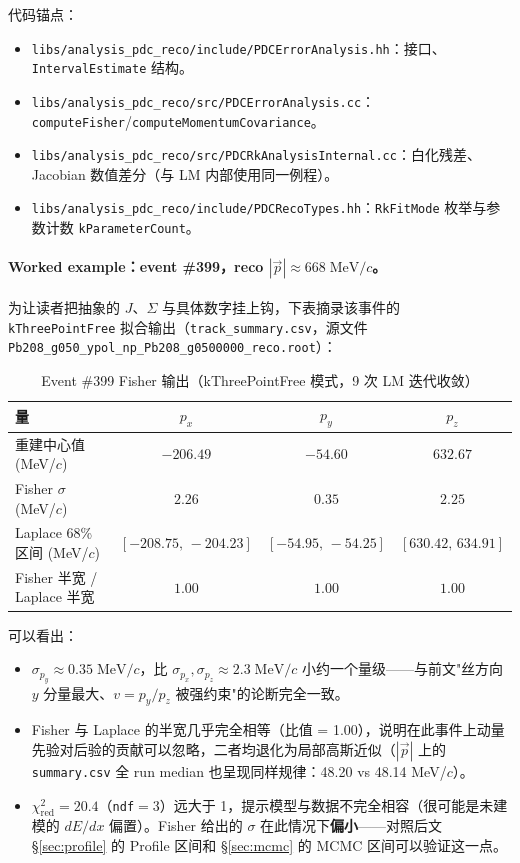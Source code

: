 \documentclass[a4paper, 11pt]{article}
\begin{document}
代码锚点：
\begin{itemize}[nosep]
  \item \texttt{libs/analysis\_pdc\_reco/include/PDCErrorAnalysis.hh}：接口、\texttt{IntervalEstimate} 结构。
  \item \texttt{libs/analysis\_pdc\_reco/src/PDCErrorAnalysis.cc}：\texttt{computeFisher}/\texttt{computeMomentumCovariance}。
  \item \texttt{libs/analysis\_pdc\_reco/src/PDCRkAnalysisInternal.cc}：白化残差、Jacobian 数值差分（与 LM 内部使用同一例程）。
  \item \texttt{libs/analysis\_pdc\_reco/include/PDCRecoTypes.hh}：\texttt{RkFitMode} 枚举与参数计数 \texttt{kParameterCount}。
\end{itemize}

\paragraph{Worked example：event \#399，reco $|\vec{p}| \approx 668\;\mathrm{MeV}/c$。}
为让读者把抽象的 $J$、$\Sigma$ 与具体数字挂上钩，下表摘录该事件的 \texttt{kThreePointFree} 拟合输出（\texttt{track\_summary.csv}，源文件 \texttt{Pb208\_g050\_ypol\_np\_Pb208\_g0500000\_reco.root}）：

\begin{table}[H]
\centering
\caption{Event \#399 Fisher 输出（kThreePointFree 模式，9 次 LM 迭代收敛）}
\label{tab:fisher_event399}
\begin{tabular}{lccc}
\toprule
量 & $p_x$ & $p_y$ & $p_z$ \\
\midrule
重建中心值 (MeV/$c$) & $-206.49$ & $-54.60$ & $632.67$ \\
Fisher $\sigma$ (MeV/$c$) & $2.26$ & $0.35$ & $2.25$ \\
Laplace 68\% 区间 (MeV/$c$) & $[-208.75,\,-204.23]$ & $[-54.95,\,-54.25]$ & $[630.42,\,634.91]$ \\
Fisher 半宽 / Laplace 半宽 & $1.00$ & $1.00$ & $1.00$ \\
\bottomrule
\end{tabular}
\end{table}

可以看出：
\begin{itemize}[nosep]
  \item $\sigma_{p_y} \approx 0.35\;\mathrm{MeV}/c$，比 $\sigma_{p_x},\sigma_{p_z} \approx 2.3\;\mathrm{MeV}/c$ 小约一个量级——与前文"丝方向 $y$ 分量最大、$v=p_y/p_z$ 被强约束"的论断完全一致。
  \item Fisher 与 Laplace 的半宽几乎完全相等（比值 = 1.00），说明在此事件上动量先验对后验的贡献可以忽略，二者均退化为局部高斯近似（$|\vec{p}|$ 上的 \texttt{summary.csv} 全 run median 也呈现同样规律：48.20 vs 48.14 MeV/$c$）。
  \item $\chi^2_\mathrm{red} = 20.4$（\texttt{ndf}$=3$）远大于 1，提示模型与数据不完全相容（很可能是未建模的 $dE/dx$ 偏置）。Fisher 给出的 $\sigma$ 在此情况下\textbf{偏小}——对照后文 §\ref{sec:profile} 的 Profile 区间和 §\ref{sec:mcmc} 的 MCMC 区间可以验证这一点。
\end{itemize}
\end{document}

